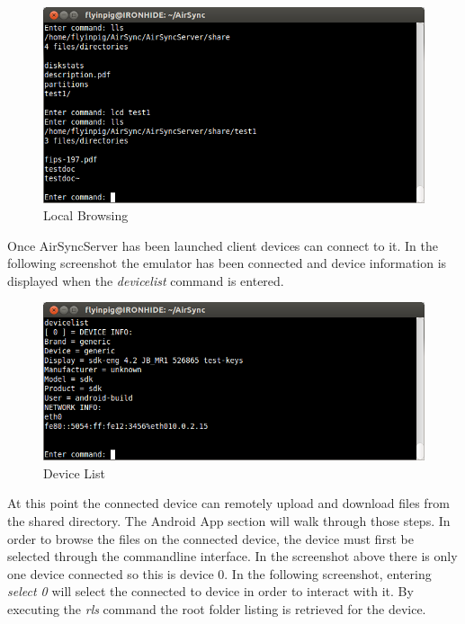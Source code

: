 \documentclass[12pt]{article}
\begin{document}
\begin{figure}[H]
\center
\includegraphics[width=1\textwidth]{jar-local-browse.png}
\caption{Local Browsing}
\end{figure}

Once AirSyncServer has been launched client devices can connect to it. In the following screenshot the emulator has been connected and device information is displayed when the \emph{devicelist} command is entered. 

\begin{figure}[H]
\center
\includegraphics[width=1\textwidth]{devicelist.png}
\caption{Device List}
\end{figure}

At this point the connected device can remotely upload and download files from the shared directory. The Android App section will walk through those steps. In order to browse the files on the connected device, the device must first be selected through the commandline interface. In the screenshot above there is only one device connected so this is device 0. In the following screenshot, entering \emph{select 0} will select the connected to device in order to interact with it. By executing the \emph{rls} command the root folder listing is retrieved for the device.
\end{document}
